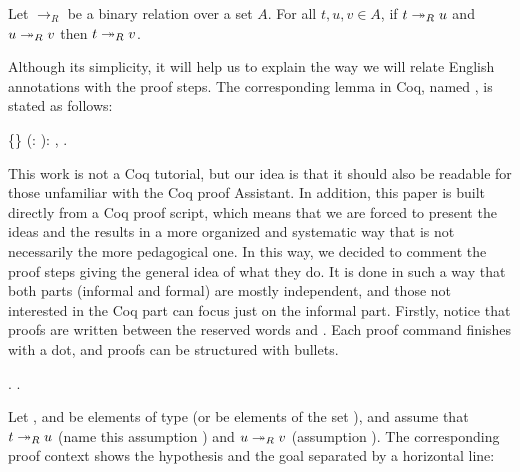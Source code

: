\begin{lemma} Let $\to_R$ be a binary relation over a set $A$. For all
$t,u,v \in A$, if $t \twoheadrightarrow_R u$ and $u \twoheadrightarrow_R v$ then $t \twoheadrightarrow_R v$.
\end{lemma}


 Although its simplicity, it will help us to explain the way we will
relate English annotations with the proof steps. The corresponding
lemma in Coq, named , is stated as follows: \begin{coqdoccode}
\coqdocemptyline
\coqdocnoindent
{}  \{\} (:  ):\coqdoceol
\coqdocindent{1.00em}
\coqdockw{\ensuremath{\forall}}   ,              .\coqdoceol
\coqdocemptyline
\end{coqdoccode}
This work is not a Coq tutorial, but our idea is that it should
also be readable for those unfamiliar with the Coq proof Assistant. In
addition, this paper is built directly from a Coq proof script, which
means that we are forced to present the ideas and the results in a
more organized and systematic way that is not necessarily the more
pedagogical one. In this way, we decided to comment the proof steps
giving the general idea of what they do. It is done in such a way that
both parts (informal and formal) are mostly independent, and those not
interested in the Coq part can focus just on the informal
part. Firstly, notice that proofs are written between the reserved
words  and . Each proof command finishes with a dot, and
proofs can be structured with bullets. \begin{coqdoccode}
\coqdocemptyline
\coqdocnoindent
{}.\coqdoceol
\coqdocindent{1.00em}
     . \end{coqdoccode}
Let , and  be elements of type 
      (or be elements of the set ), and assume that $t \twoheadrightarrow_R u$
      (name this assumption ) and $u\twoheadrightarrow_R v$ (assumption
      ). The corresponding proof context shows the hypothesis and
      the goal separated by a horizontal line: \newline



